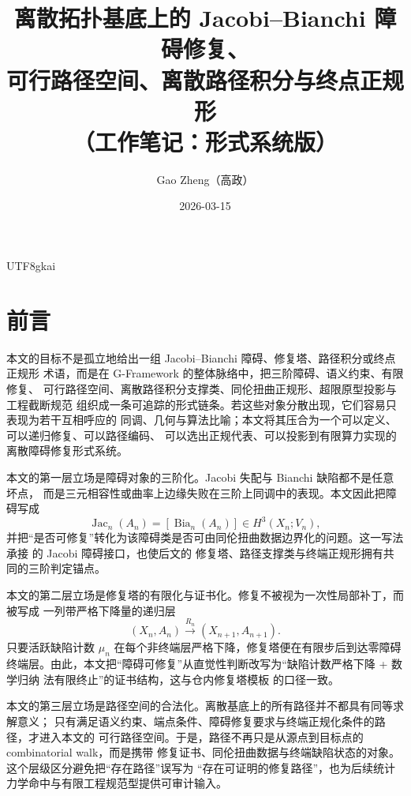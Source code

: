 \documentclass[12pt]{article}
\newcommand{\GFramework}{\textsf{G-Framework}}
\newcommand{\Bia}{\operatorname{Bia}}
\newcommand{\Jac}{\operatorname{Jac}}
\begin{document}
\begin{CJK*}{UTF8}{gkai}

\title{离散拓扑基底上的 Jacobi--Bianchi 障碍修复、\\可行路径空间、离散路径积分与终点正规形\\（工作笔记：形式系统版）}
\author{Gao Zheng（高政）}
\date{2026-03-15}
\maketitle

\section*{前言}

本文的目标不是孤立地给出一组 Jacobi--Bianchi 障碍、修复塔、路径积分或终点正规形
术语，而是在 \GFramework{} 的整体脉络中，把三阶障碍、语义约束、有限修复、
可行路径空间、离散路径积分支撑类、同伦扭曲正规形、超限原型投影与工程截断规范
组织成一条可追踪的形式链条。若这些对象分散出现，它们容易只表现为若干互相呼应的
同调、几何与算法比喻；本文将其压合为一个可以定义、可以递归修复、可以路径编码、
可以选出正规代表、可以投影到有限算力实现的离散障碍修复形式系统。

本文的第一层立场是障碍对象的三阶化。Jacobi 失配与 Bianchi 缺陷都不是任意坏点，
而是三元相容性或曲率上边缘失败在三阶上同调中的表现。本文因此把障碍写成
\[
  \Jac_n(A_n)=[\Bia_n(A_n)]\in H^3(X_n;V_n),
\]
并把“是否可修复”转化为该障碍类是否可由同伦扭曲数据边界化的问题。这一写法承接
\cite{RepoTex6JacobiGap,GaoZheng2025GFramework} 的 Jacobi 障碍接口，也使后文的
修复塔、路径支撑类与终端正规形拥有共同的三阶判定锚点。

本文的第二层立场是修复塔的有限化与证书化。修复不被视为一次性局部补丁，而被写成
一列带严格下降量的递归层
\[
  (X_n,A_n)\xrightarrow{R_n}(X_{n+1},A_{n+1}).
\]
只要活跃缺陷计数 \(\mu_n\) 在每个非终端层严格下降，修复塔便在有限步后到达零障碍
终端层。由此，本文把“障碍可修复”从直觉性判断改写为“缺陷计数严格下降 + 数学归纳
法有限终止”的证书结构，这与仓内修复塔模板 \cite{RepoTex31RepairTower} 的口径一致。

本文的第三层立场是路径空间的合法化。离散基底上的所有路径并不都具有同等求解意义；
只有满足语义约束、端点条件、障碍修复要求与终端正规化条件的路径，才进入本文的
可行路径空间。于是，路径不再只是从源点到目标点的 combinatorial walk，而是携带
修复证书、同伦扭曲数据与终端缺陷状态的对象。这个层级区分避免把“存在路径”误写为
“存在可证明的修复路径”，也为后续统计力学命中与有限工程规范型提供可审计输入。


\end{CJK*}
\end{document}
